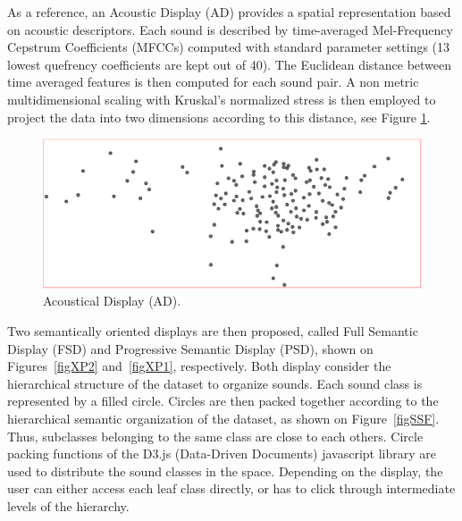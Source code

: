 \documentclass{aes2e}
\begin{document}
As a reference, an Acoustic Display (AD) provides a spatial representation based on acoustic descriptors. Each sound is described by time-averaged Mel-Frequency Cepstrum Coefficients (MFCCs) computed with standard parameter settings (13 lowest quefrency coefficients are kept out of 40). The Euclidean distance between time averaged features is then computed for each sound pair. A non metric multidimensional scaling with Kruskal's normalized stress \cite{kruskal1964multidimensional} is then employed to project the data into two dimensions according to this distance, see Figure \ref{figXP3}.

\begin{figure}[t]
\begin{center}
\includegraphics[scale=0.18]{gfx/xp3.png} 
\end{center}
\caption{\label{figXP3} Acoustical Display (AD).}
\end{figure}


Two semantically oriented displays are then proposed, called Full Semantic Display (FSD) and Progressive Semantic Display (PSD), shown on Figures~\ref{figXP2} and~\ref{figXP1}, respectively. Both display  consider the hierarchical structure of the dataset to organize sounds. Each sound class is represented by a filled circle. Circles are then packed together according to the hierarchical semantic organization of the dataset, as shown on Figure~\ref{figSSF}. Thus, subclasses belonging to the same class are close to each others. Circle packing functions of the D3.js (Data-Driven Documents) javascript library \cite{2011-d3} are used to distribute the sound classes in the space. Depending on the display, the user can either access each leaf class directly, or has to click through intermediate levels of the hierarchy. 
\end{document}
